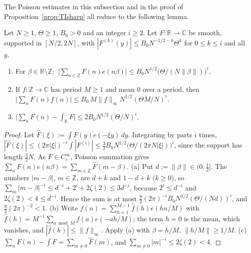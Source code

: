 The Poisson estimates in this subsection and in the proof of Proposition~\ref{prop:TIsharp} all reduce to the following lemma.

\begin{lemma}\label{lem:poisson}
Let $N\ge1$, $\Theta\ge1$, $B_0>0$ and an integer $i\ge2$. Let $F:\mathbb R\to\mathbb C$ be smooth, supported in $[N/2,2N]$, with
$|F^{(k)}(y)|\le B_0N^{-1/2-k}\Theta^k$ for $0\le k\le i$ and all $y$.
\begin{enumerate}
\item[(a)] For $\beta\in\mathbb R\setminus\mathbb Z$: $\ \big|\sum_{n\in\mathbb Z}F(n)e(n\beta)\big|\le B_0N^{1/2}\big(\Theta/(N\|\beta\|)\big)^i$.
\item[(b)] If $f:\mathbb Z\to\mathbb C$ has period $M\ge1$ and mean $0$ over a period, then
 $\big|\sum_nF(n)f(n)\big|\le B_0\,M\|f\|_\infty N^{1/2}(\Theta M/N)^i$.
\item[(c)] $\big|\sum_nF(n)-\int_{\mathbb R}F\big|\le 2B_0N^{1/2}(\Theta/N)^i$.
\end{enumerate}
\end{lemma}

\begin{proof}
Let $\widehat F(\xi):=\int F(y)e(-\xi y)\,dy$. Integrating by parts $i$ times,
$|\widehat F(\xi)|\le(2\pi|\xi|)^{-i}\int|F^{(i)}|\le\frac32B_0N^{1/2}\big(\Theta/(2\pi N|\xi|)\big)^i$, since the support has length $\frac32N$.
As $F\in C_c^\infty$, Poisson summation gives $\sum_nF(n)e(n\beta)=\sum_{m\in\mathbb Z}\widehat F(m-\beta)$.
(a) Put $d:=\|\beta\|\in(0,\frac12]$. The numbers $|m-\beta|$, $m\in\mathbb Z$, are $d+k$ and $1-d+k$ ($k\ge0$), so
$\sum_m|m-\beta|^{-i}\le d^{-i}+2^i+2\zeta(2)\le3d^{-i}$, because $2^i\le d^{-i}$ and $2\zeta(2)<4\le d^{-i}$. Hence the sum is at most
$\frac92(2\pi)^{-i}B_0N^{1/2}(\Theta/(Nd))^i$, and $\frac92(2\pi)^{-2}<1$.
(b) Write $f(n)=\sum_{h=1}^{M-1}\widehat f(h)e(hn/M)$ with $\widehat f(h)=M^{-1}\sum_{a\bmod M}f(a)e(-ah/M)$; the term $h=0$ is the mean, which
vanishes, and $|\widehat f(h)|\le\|f\|_\infty$. Apply (a) with $\beta=h/M$, $\|h/M\|\ge1/M$.
(c) $\sum_nF(n)-\int F=\sum_{m\ne0}\widehat F(m)$, and $\sum_{m\ne0}|m|^{-i}\le2\zeta(2)<4$.
\end{proof}

